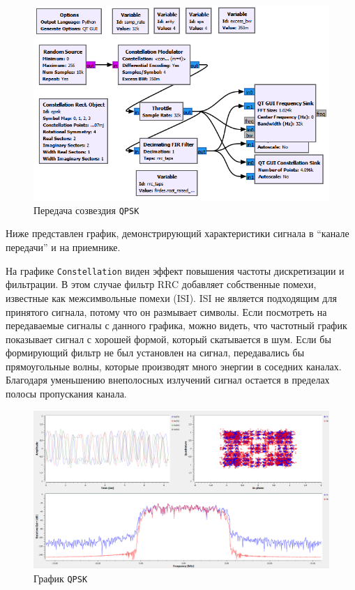 \documentclass[a4paper]{article}
\begin{document}
           \begin{figure}[H]
                \centering
                \includegraphics[width=\textwidth]{ex_1_1.png}
                \caption{Передача созвездия \texttt{QPSK}}
                \label{fig:ex_1_1}
            \end{figure}
            
            Ниже представлен график, демонстрирующий характеристики сигнала в “канале передачи” и на приемнике. 
            
            На графике \texttt{Constellation} виден эффект повышения частоты дискретизации и фильтрации. В этом случае фильтр RRC добавляет собственные помехи, известные как межсимвольные помехи (ISI). ISI не является подходящим для принятого сигнала, потому что он размывает символы. Если посмотреть на передаваемые сигналы с данного графика, можно видеть, что частотный график показывает сигнал с хорошей формой, который скатывается в шум. Если бы формирующий фильтр не был установлен на сигнал, передавались бы прямоугольные волны, которые производят много энергии в соседних каналах. Благодаря уменьшению внеполосных излучений сигнал остается в пределах полосы пропускания канала.
            
            \begin{figure}[H]
                \centering
                \includegraphics[width=\textwidth]{ex_1_2.png}
                \caption{График \texttt{QPSK}}
                \label{fig:ex_1_2}
            \end{figure}
            
\end{document}
